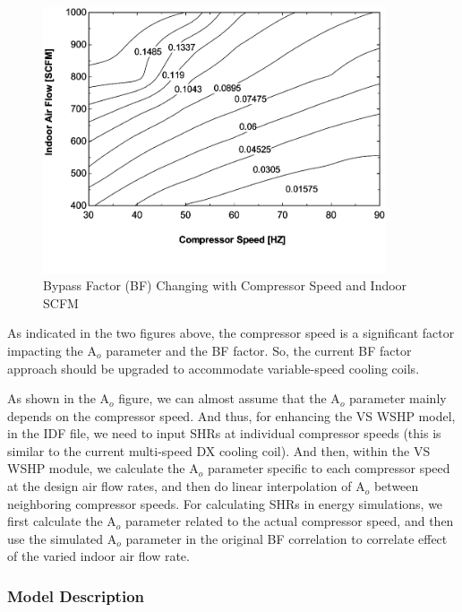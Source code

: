 \begin{figure}[hbtp] %
\centering
\includegraphics[width=0.9\textwidth, height=0.9\textheight, keepaspectratio=true]{media/image4241.svg.png}
\caption{Bypass Factor (BF) Changing with Compressor Speed and Indoor SCFM \protect \label{fig:bypass-factor-bf-changing-with-compressor}}
\end{figure}

As indicated in the two figures above, the compressor speed is a significant factor impacting the A\(_{o}\) parameter and the BF factor. So, the current BF factor approach should be upgraded to accommodate variable-speed cooling coils.

As shown in the A\(_{o}\) figure, we can almost assume that the A\(_{o}\) parameter mainly depends on the compressor speed. And thus, for enhancing the VS WSHP model, in the IDF file, we need to input SHRs at individual compressor speeds (this is similar to the current multi-speed DX cooling coil). And then, within the VS WSHP module, we calculate the A\(_{o}\) parameter specific to each compressor speed at the design air flow rates, and then do linear interpolation of A\(_{o}\) between neighboring compressor speeds. For calculating SHRs in energy simulations, we first calculate the A\(_{o}\) parameter related to the actual compressor speed, and then use the simulated A\(_{o}\) parameter in the original BF correlation to correlate effect of the varied indoor air flow rate.

\subsubsection{Model Description}\label{model-description-11}

